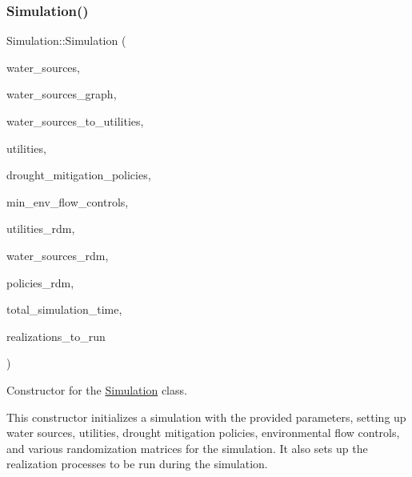 \subsubsection{\texorpdfstring{Simulation()}{Simulation()}\hspace{0.1cm}{\footnotesize\ttfamily [1/3]}}
{\footnotesize\ttfamily Simulation\+::\+Simulation (\begin{DoxyParamCaption}\item[{vector$<$ \mbox{\hyperlink{classWaterSource}{Water\+Source}} $\ast$$>$ \&}]{water\+\_\+sources,  }\item[{\mbox{\hyperlink{classGraph}{Graph}} \&}]{water\+\_\+sources\+\_\+graph,  }\item[{const vector$<$ vector$<$ int $>$$>$ \&}]{water\+\_\+sources\+\_\+to\+\_\+utilities,  }\item[{vector$<$ \mbox{\hyperlink{classUtility}{Utility}} $\ast$$>$ \&}]{utilities,  }\item[{const vector$<$ \mbox{\hyperlink{classDroughtMitigationPolicy}{Drought\+Mitigation\+Policy}} $\ast$$>$ \&}]{drought\+\_\+mitigation\+\_\+policies,  }\item[{vector$<$ \mbox{\hyperlink{classMinEnvFlowControl}{Min\+Env\+Flow\+Control}} $\ast$$>$ \&}]{min\+\_\+env\+\_\+flow\+\_\+controls,  }\item[{vector$<$ vector$<$ double $>$$>$ \&}]{utilities\+\_\+rdm,  }\item[{vector$<$ vector$<$ double $>$$>$ \&}]{water\+\_\+sources\+\_\+rdm,  }\item[{vector$<$ vector$<$ double $>$$>$ \&}]{policies\+\_\+rdm,  }\item[{const unsigned long}]{total\+\_\+simulation\+\_\+time,  }\item[{vector$<$ unsigned long $>$ \&}]{realizations\+\_\+to\+\_\+run }\end{DoxyParamCaption})}



Constructor for the \mbox{\hyperlink{classSimulation}{Simulation}} class. 

This constructor initializes a simulation with the provided parameters, setting up water sources, utilities, drought mitigation policies, environmental flow controls, and various randomization matrices for the simulation. It also sets up the realization processes to be run during the simulation.



